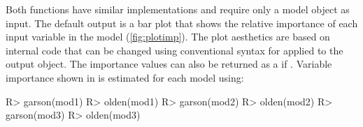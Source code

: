 \documentclass[article]{jss}
\begin{document}
Both functions have similar implementations and require only a model
object as input.  The default output is a  bar plot
\citep[i.e., ;][]{Wickham09} that shows the relative
importance of each input variable in the model (\cref{fig:plotimp}).
The plot aesthetics are based on internal code that can be changed
using conventional syntax for  applied to the output
object.  The importance values can also be returned as a
 if .  Variable importance
shown in  is estimated for each model using:
%
\begin{Schunk}
\begin{Sinput}
R> garson(mod1)
R> olden(mod1)
R> garson(mod2)
R> olden(mod2)
R> garson(mod3)
R> olden(mod3)
\end{Sinput}
\end{Schunk}
%
\end{document}
